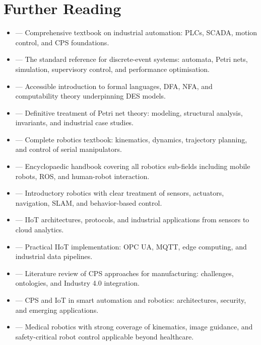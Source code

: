 \section{Further Reading}

\begin{tcbitemize}[ skin=sectionraster ]
    \tcbitem[title=Recommended Sources for Industrial AI, raster multicolumn=6]
    \begin{itemize}
        \item {} --- Comprehensive textbook on industrial automation: PLCs, SCADA, motion control, and CPS foundations.
        \item {} --- The standard reference for discrete-event systems: automata, Petri nets, simulation, supervisory control, and performance optimisation.
        \item {} --- Accessible introduction to formal languages, DFA, NFA, and computability theory underpinning DES models.
        \item {} --- Definitive treatment of Petri net theory: modeling, structural analysis, invariants, and industrial case studies.
        \item {} --- Complete robotics textbook: kinematics, dynamics, trajectory planning, and control of serial manipulators.
        \item {} --- Encyclopaedic handbook covering all robotics sub-fields including mobile robots, ROS, and human-robot interaction.
        \item {} --- Introductory robotics with clear treatment of sensors, actuators, navigation, SLAM, and behavior-based control.
        \item {} --- IIoT architectures, protocols, and industrial applications from sensors to cloud analytics.
        \item {} --- Practical IIoT implementation: OPC UA, MQTT, edge computing, and industrial data pipelines.
        \item {} --- Literature review of CPS approaches for manufacturing: challenges, ontologies, and Industry 4.0 integration.
        \item {} --- CPS and IoT in smart automation and robotics: architectures, security, and emerging applications.
        \item {} --- Medical robotics with strong coverage of kinematics, image guidance, and safety-critical robot control applicable beyond healthcare.
    \end{itemize}
\end{tcbitemize}
